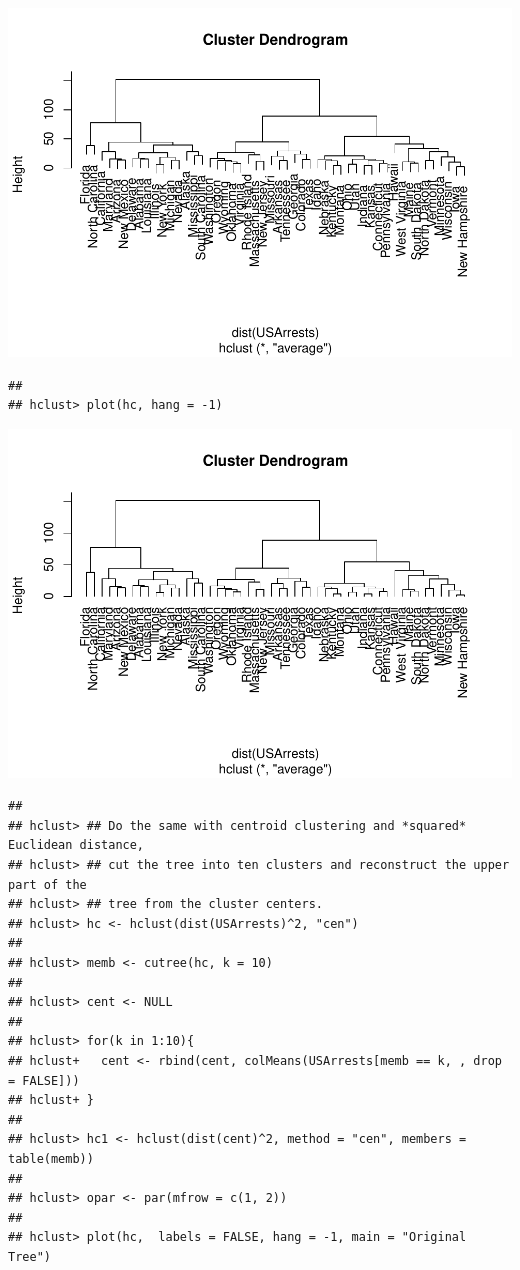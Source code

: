 \documentclass[
]{book}
\begin{document}
\includegraphics{bookdown-demo_files/figure-latex/unnamed-chunk-11-1.pdf}

\begin{verbatim}
## 
## hclust> plot(hc, hang = -1)
\end{verbatim}

\includegraphics{bookdown-demo_files/figure-latex/unnamed-chunk-11-2.pdf}

\begin{verbatim}
## 
## hclust> ## Do the same with centroid clustering and *squared* Euclidean distance,
## hclust> ## cut the tree into ten clusters and reconstruct the upper part of the
## hclust> ## tree from the cluster centers.
## hclust> hc <- hclust(dist(USArrests)^2, "cen")
## 
## hclust> memb <- cutree(hc, k = 10)
## 
## hclust> cent <- NULL
## 
## hclust> for(k in 1:10){
## hclust+   cent <- rbind(cent, colMeans(USArrests[memb == k, , drop = FALSE]))
## hclust+ }
## 
## hclust> hc1 <- hclust(dist(cent)^2, method = "cen", members = table(memb))
## 
## hclust> opar <- par(mfrow = c(1, 2))
## 
## hclust> plot(hc,  labels = FALSE, hang = -1, main = "Original Tree")
\end{verbatim}
\end{document}
